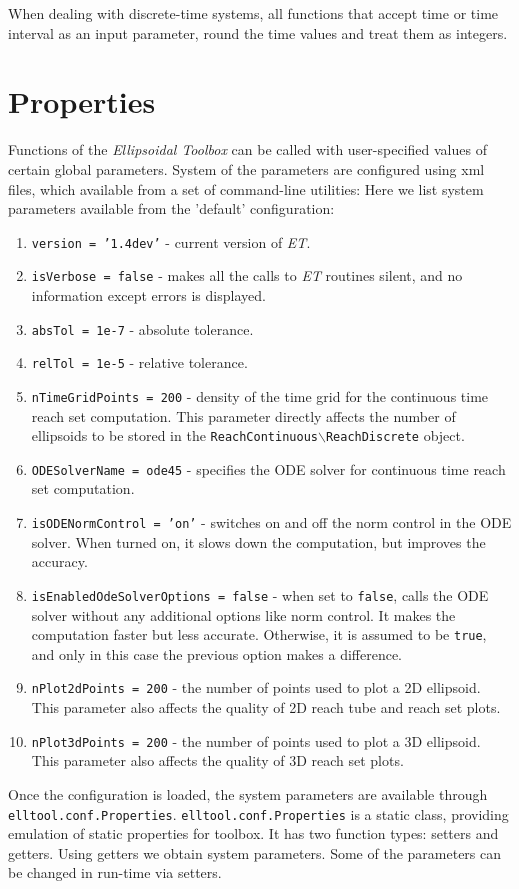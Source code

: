 When dealing with discrete-time systems, all functions that accept time or
time interval as an input parameter, round the time values and treat them as
integers.
\section{Properties}
Functions of the {\it Ellipsoidal Toolbox} can be called with
user-specified values of certain global parameters. System of the parameters
are configured using xml files, which  available from a set of command-line
utilities:
Here we list system parameters available from the 'default' configuration:
\begin{enumerate}
\item {\tt version = '1.4dev'} - current version of {\it ET}.
\item {\tt isVerbose = false} - makes all the calls to {\it ET}
routines silent, and no information except errors is displayed.
\item {\tt absTol = 1e-7} - absolute tolerance.
\item {\tt relTol = 1e-5} - relative tolerance.
\item {\tt nTimeGridPoints = 200} - density of the time grid for the
continuous time reach set computation.
This parameter directly affects the number of ellipsoids to
be stored in the {\tt ReachContinuous$\backslash$ReachDiscrete} object.
\item {\tt ODESolverName = ode45} - specifies the ODE solver for continuous time
reach set computation.
\item {\tt isODENormControl = 'on'} - switches on and off the norm control
in the ODE solver. When turned on, it slows down the computation, but improves
the accuracy.
\item {\tt isEnabledOdeSolverOptions = false} - when set to {\tt false}, calls the ODE solver
without any additional options like norm control. It makes the computation
faster but less accurate. Otherwise, it is assumed to be {\tt true}, and only in this
case the previous option makes a difference.
\item {\tt nPlot2dPoints = 200} - the number of points used to plot a
2D ellipsoid. This parameter also affects the quality of 2D reach tube
and reach set plots.
\item {\tt nPlot3dPoints = 200} - the number of points used to plot
a 3D ellipsoid. This parameter also affects the quality of 3D reach set plots.
\end{enumerate}
Once the configuration is loaded, the system parameters are available through
{\tt elltool.conf.Properties}.
{\tt elltool.conf.Properties} is a static class, providing emulation of static
properties for toolbox. It has two function types: setters and getters.
Using getters we obtain system parameters.
 Some of the parameters can be changed
in run-time via setters.
